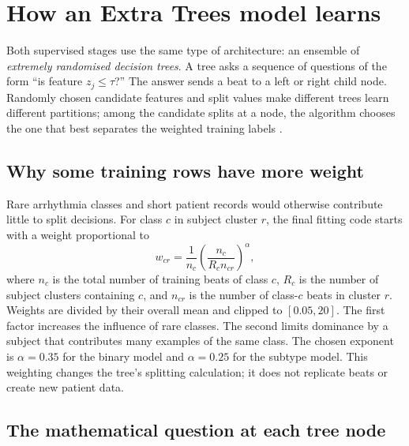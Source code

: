 \section{How an Extra Trees model learns}

Both supervised stages use the same type of architecture: an ensemble of
\emph{extremely randomised decision trees}. A tree asks a sequence of
questions of the form ``is feature $z_j\leq\tau$?'' The answer sends a beat
to a left or right child node. Randomly chosen candidate features and split
values make different trees learn different partitions; among the candidate
splits at a node, the algorithm chooses the one that best separates the
weighted training labels \cite{geurts2006extratrees}.

\subsection{Why some training rows have more weight}

Rare arrhythmia classes and short patient records would otherwise contribute
little to split decisions. For class $c$ in subject cluster $r$, the final
fitting code starts with a weight proportional to
\begin{equation}
 w_{cr}=\frac{1}{n_c}
 \left(\frac{n_c}{R_c n_{cr}}\right)^\alpha,
 \label{eq:method-record-weight}
\end{equation}
where $n_c$ is the total number of training beats of class $c$, $R_c$ is the
number of subject clusters containing $c$, and $n_{cr}$ is the number of
class-$c$ beats in cluster $r$. Weights are divided by their overall mean
and clipped to $[0.05,20]$. The first factor increases the influence of
rare classes. The second limits dominance by a subject that contributes many
examples of the same class. The chosen exponent is $\alpha=0.35$ for the
binary model and $\alpha=0.25$ for the subtype model. This weighting changes
the tree's splitting calculation; it does not replicate beats or create
new patient data.

\subsection{The mathematical question at each tree node}


